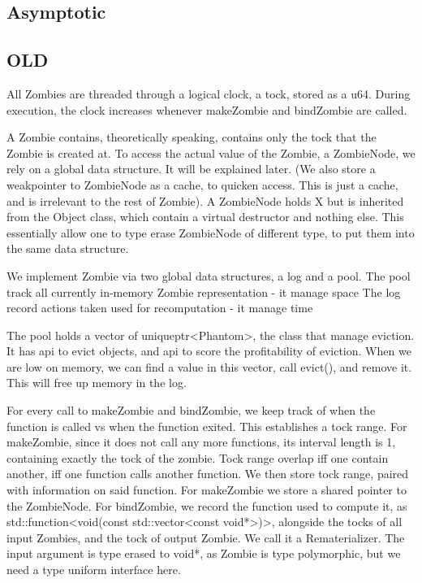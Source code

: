 \subsection{Asymptotic}

\subsection{OLD}
All Zombies are threaded through a logical clock, a tock, stored as a u64.
During execution, the clock increases whenever makeZombie and bindZombie are called.

A Zombie contains, theoretically speaking, contains only the tock that the Zombie is created at.
To access the actual value of the Zombie, a ZombieNode, we rely on a global data structure.
It will be explained later.
(We also store a weakpointer to ZombieNode as a cache, to quicken access. This is just a cache, and is irrelevant to the rest of Zombie).
A ZombieNode holds X but is inherited from the Object class, which contain a virtual destructor and nothing else. This essentially allow one to type erase ZombieNode of different type, to put them into the same data structure.

We implement Zombie via two global data structures, a log and a pool.
The pool track all currently in-memory Zombie representation - it manage space
The log record actions taken used for recomputation - it manage time

The pool holds a vector of uniqueptr<Phantom>, the class that manage eviction.
It has api to evict objects, and api to score the profitability of eviction.
When we are low on memory, we can find a value in this vector, call evict(), and remove it.
This will free up memory in the log.

For every call to makeZombie and bindZombie, we keep track of when the function is called vs when the function exited. This establishes a tock range. 
For makeZombie, since it does not call any more functions, its interval length is 1, containing exactly the tock of the zombie.
Tock range overlap iff one contain another, iff one function calls another function. We then store tock range, paired with information on said function. 
For makeZombie we store a shared pointer to the ZombieNode. 
For bindZombie, we record the function used to compute it, as std::function<void(const std::vector<const void*>)>, alongside the tocks of all input Zombies, and the tock of output Zombie. We call it a Rematerializer. The input argument is type erased to void*, as Zombie is type polymorphic, but we need a type uniform interface here.

